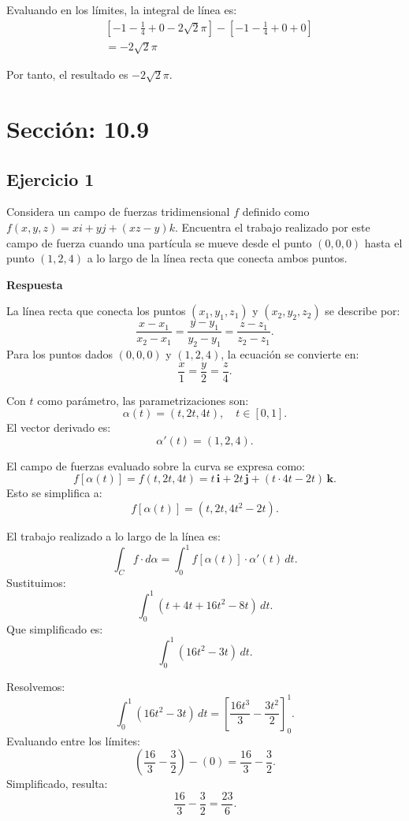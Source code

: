\documentclass{report}
\begin{document}
Evaluando en los límites, la integral de línea es:
$$
\begin{aligned}
& \left[-1 - \frac{1}{4} + 0 - 2 \sqrt{2} \pi\right] - \left[-1 - \frac{1}{4} + 0 + 0\right] \\
& = -2 \sqrt{2} \pi
\end{aligned}
$$

Por tanto, el resultado es \(-2 \sqrt{2} \pi\).

\section*{\textcolor{color109}{Sección: 10.9}}
\subsection*{Ejercicio 1}
Considera un campo de fuerzas tridimensional $f$ definido como $f(x, y, z)= x i+y j+(x z-y) k$. Encuentra el trabajo realizado por este campo de fuerza cuando una partícula se mueve desde el punto $(0,0,0)$ hasta el punto $(1,2,4)$ a lo largo de la línea recta que conecta ambos puntos.

\textbf{Respuesta}


La línea recta que conecta los puntos \((x_1, y_1, z_1)\) y \((x_2, y_2, z_2)\) se describe por:
\[
\frac{x - x_1}{x_2 - x_1} = \frac{y - y_1}{y_2 - y_1} = \frac{z - z_1}{z_2 - z_1}.
\]
Para los puntos dados \((0, 0, 0)\) y \((1, 2, 4)\), la ecuación se convierte en:
\[
\frac{x}{1} = \frac{y}{2} = \frac{z}{4}.
\]


Con \(t\) como parámetro, las parametrizaciones son:
\[
\alpha(t) = (t, 2t, 4t), \quad t \in [0, 1].
\]
El vector derivado es:
\[
\alpha'(t) = (1, 2, 4).
\]


El campo de fuerzas evaluado sobre la curva se expresa como:
\[
f[\alpha(t)] = f(t, 2t, 4t) = t \, \mathbf{i} + 2t \, \mathbf{j} + \left(t \cdot 4t - 2t\right) \, \mathbf{k}.
\]
Esto se simplifica a:
\[
f[\alpha(t)] = (t, 2t, 4t^2 - 2t).
\]


El trabajo realizado a lo largo de la línea es:
\[
\int_C f \cdot d\alpha = \int_0^1 f[\alpha(t)] \cdot \alpha'(t) \, dt.
\]
Sustituimos:
\[
\int_0^1 (t + 4t + 16t^2 - 8t) \, dt.
\]
Que simplificado es:
\[
\int_0^1 (16t^2 - 3t) \, dt.
\]


Resolvemos:
\[
\int_0^1 (16t^2 - 3t) \, dt = \left[\frac{16t^3}{3} - \frac{3t^2}{2}\right]_0^1.
\]
Evaluando entre los límites:
\[
\left(\frac{16}{3} - \frac{3}{2}\right) - (0) = \frac{16}{3} - \frac{3}{2}.
\]
Simplificado, resulta:
\[
\frac{16}{3} - \frac{3}{2} = \frac{23}{6}.
\]
\end{document}
